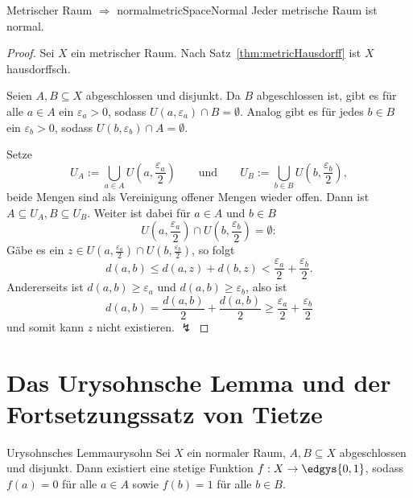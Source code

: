 \documentclass[language=ngerman]{TemplateLecture} %
\begin{document}
\begin{thm}{Metrischer Raum $\Rightarrow$ normal}{metricSpaceNormal}
    Jeder metrische Raum ist normal.
\end{thm}
\begin{proof}
    Sei $X$ ein metrischer Raum. Nach Satz~\ref{thm:metricHausdorff} ist $X$ hausdorffsch.

    Seien $A, B \subseteq X$ abgeschlossen und disjunkt. Da $B$ abgeschlossen ist, gibt es für alle $a \in A$ ein $\varepsilon_a > 0$, sodass $U(a, \varepsilon_a) \cap B = \emptyset$. Analog gibt es für jedes $b \in B$ ein $\varepsilon_b > 0$, sodass $U(b, \varepsilon_b) \cap A = \emptyset$.

    Setze 
    \begin{equation*}
        U_A := \bigcup_{a \in A} U\left(a, \frac{\varepsilon_a}{2}\right) \quad \quad \text{und} \quad \quad U_B := \bigcup_{b \in B} U\left(b, \frac{\varepsilon_b}{2}\right),
    \end{equation*} 
    beide Mengen sind als Vereinigung offener Mengen wieder offen. Dann ist $A \subseteq U_A, B \subseteq U_B$. Weiter ist dabei für $a \in A$ und $b \in B$ 
    \begin{equation*}
        U\left(a, \frac{\varepsilon_a}{2}\right) \cap U\left(b, \frac{\varepsilon_b}{2}\right) = \emptyset:
    \end{equation*}
    Gäbe es ein $z \in U\left(a, \frac{\varepsilon_a}{2}\right) \cap U\left(b, \frac{\varepsilon_b}{2}\right)$, so folgt 
    \begin{equation*}
        d(a,b) \leq d(a,z) + d(b,z) < \frac{\varepsilon_a}{2} + \frac{\varepsilon_b}{2}.
    \end{equation*}
    Andererseits ist $d(a,b) \geq \varepsilon_a$ und $d(a,b) \geq \varepsilon_b$, also ist 
    \begin{equation*}
        d(a,b) = \frac{d(a,b)}{2} + \frac{d(a,b)}{2} \geq \frac{\varepsilon_a}{2} + \frac{\varepsilon_b}{2}
    \end{equation*}
    und somit kann $z$ nicht existieren. $\lightning$
\end{proof}


\chapter{Das Urysohnsche Lemma und der Fortsetzungssatz von Tietze}

\begin{thm}{Urysohnsches Lemma}{urysohn}
    Sei $X$ ein normaler Raum, $A, B \subseteq X$ abgeschlossen und disjunkt. Dann existiert eine stetige Funktion $f: X \to \edgys{0,1}$, sodass $f(a) = 0$ für alle $a \in A$ sowie $f(b) = 1$ für alle $b \in B$.
\end{thm}
\end{document}
